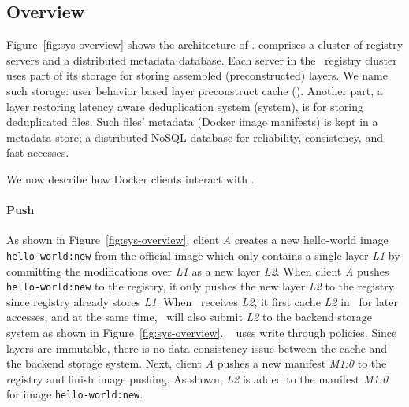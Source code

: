 \vspace{-4pt}
\subsection{Overview}
\label{sec:design}
\vspace{-4pt}



Figure~\ref{fig:sys-overview} shows the architecture of \sysname.
 \sysname comprises a cluster of registry servers and a distributed metadata database. 
Each server in the \sysname~registry cluster uses part of its storage for storing assembled (\ie preconstructed) layers. 
We name such storage: user behavior based layer preconstruct cache (\preconstructcachename).
Another part, a layer restoring latency aware deduplication system (\dedupname system), is for storing deduplicated files. 
Such files' metadata (\eg Docker image manifests) is kept in a metadata store; a distributed NoSQL database for 
reliability, consistency, and fast accesses.

We now describe how Docker clients interact with \sysname.

\paragraph{Push}
As shown in Figure~\ref{fig:sys-overview}, client \textit{A} creates a new hello-world image
\texttt{hello-world:new}
from the official image which only contains a single layer \textit{L1}
by 
committing
the modifications over \textit{L1} as a new layer \textit{L2}.  
When client \textit{A} pushes \texttt{hello-world:new} to the registry,
it only pushes the new layer \textit{L2} to the registry since registry already stores \textit{L1}.
When \sysname~receives \textit{L2}, 
it first cache \textit{L2} in \preconstructcachename~for later accesses,
and at the same time, 
\sysname~will also submit \textit{L2} to the backend storage system as shown in Figure~\ref{fig:sys-overview}.
\preconstructcachename~ uses write through policies. 
Since layers are immutable, 
there is no data consistency issue between the cache and the backend storage system.
Next, client \textit{A} pushes a new manifest \textit{M1:0} to the registry and finish image pushing.
As shown, \textit{L2} is added to the manifest \textit{M1:0} for image \texttt{hello-world:new}.


